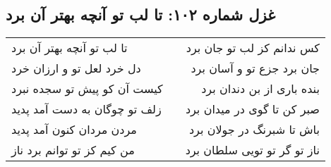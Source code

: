 \begin{center}
\section*{غزل شماره ۱۰۲: تا لب تو آنچه بهتر آن برد}
\label{sec:102}
\begin{longtable}{l p{0.5cm} r}
تا لب تو آنچه بهتر آن برد
&&
کس ندانم کز لب تو جان برد
\\
دل خرد لعل تو و ارزان خرد
&&
جان برد جزع تو و آسان برد
\\
کیست آن کو پیش تو سجده نبرد
&&
بنده باری از بن دندان برد
\\
زلف تو چوگان به دست آمد پدید
&&
صبر کن تا گوی در میدان برد
\\
مردن مردان کنون آمد پدید
&&
باش تا شبرنگ در جولان برد
\\
من کیم کز تو توانم برد ناز
&&
ناز تو گر تو تویی سلطان برد
\\
\end{longtable}
\end{center}
